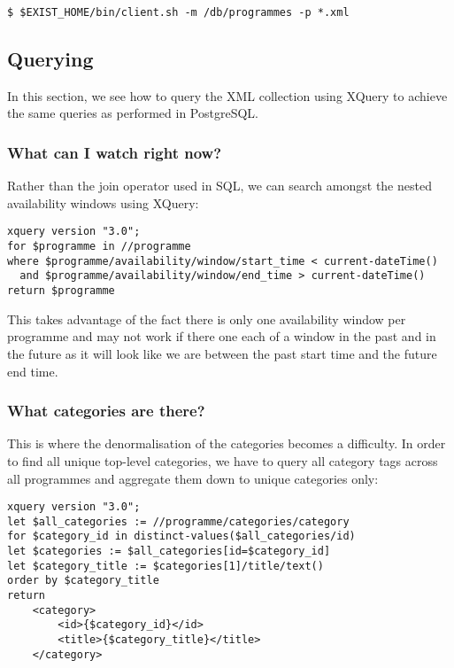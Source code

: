 \documentclass[11pt,a4paper]{article}
\begin{document}
\begin{lstlisting}
$ $EXIST_HOME/bin/client.sh -m /db/programmes -p *.xml
\end{lstlisting}

\subsection{Querying}

In this section, we see how to query the XML collection using XQuery to
achieve the same queries as performed in PostgreSQL.

\subsubsection{What can I watch right now?}

Rather than the join operator used in SQL, we can search amongst
the nested availability windows using XQuery:

\begin{lstlisting}
xquery version "3.0";
for $programme in //programme
where $programme/availability/window/start_time < current-dateTime()
  and $programme/availability/window/end_time > current-dateTime()
return $programme
\end{lstlisting}

This takes advantage of the fact there is only one availability window
per programme and may not work if there one each of a window in
the past and in the future as it will look like we are between the past
start time and the future end time.

\pagebreak

\subsubsection{What categories are there?}

This is where the denormalisation of the categories becomes a difficulty.
In order to find all unique top-level categories, we have to query all
category tags across all programmes and aggregate them down to unique
categories only:

\begin{lstlisting}
xquery version "3.0";
let $all_categories := //programme/categories/category
for $category_id in distinct-values($all_categories/id)
let $categories := $all_categories[id=$category_id]
let $category_title := $categories[1]/title/text()
order by $category_title
return 
    <category>
        <id>{$category_id}</id>
        <title>{$category_title}</title>
    </category>
\end{lstlisting}
\end{document}
